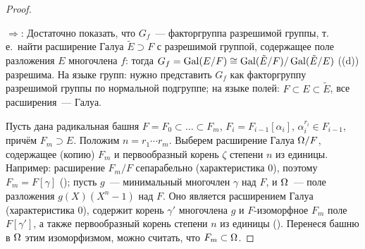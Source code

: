 \begin{proof}
\begin{center}
\end{center}

$\Rightarrow$: Достаточно показать, что $G_f$~--- факторгруппа разрешимой группы, т.\,е.\ найти расширение Галуа
$\tilde E\supset F$ с разрешимой группой, содержащее поле разложения $E$ многочлена $f$: тогда $G_f=\operatorname{Gal}(E/F)\cong
\operatorname{Gal}(\tilde E/F)/\operatorname{Gal}(\tilde E/E)$ ((d)) разрешима. На языке групп: нужно представить $G_f$ как факторгруппу
разрешимой группы по нормальной подгруппе; на языке полей: $F\subset E\subset\tilde E$, все расширения~--- Галуа.

Пусть дана радикальная башня $F=F_0\subset\dots\subset F_m$, $F_i=F_{i-1}[\alpha_i]$, $\alpha_i^{r_i}\in F_{i-1}$, причём
$F_m\supset E$. Положим $n=r_1\cdots r_m$. Выберем расширение Галуа $\Omega/F$, содержащее (копию) $F_m$ и первообразный
корень $\zeta$ степени $n$ из единицы. Например: расширение $F_m/F$ сепарабельно (характеристика $0$), поэтому
$F_m=F[\gamma]$ (); пусть $g$~--- минимальный многочлен $\gamma$ над $F$, и $\Omega$~--- поле разложения $g(X)(X^n-1)$ над
$F$. Оно является расширением Галуа (характеристика $0$), содержит корень $\gamma'$ многочлена $g$ и $F$-изоморфное $F_m$
поле $F[\gamma']$, а также первообразный корень степени $n$ из единицы (). Перенеся башню в $\Omega$ этим изоморфизмом,
можно считать, что $F_m\subset\Omega$.


\end{proof}
